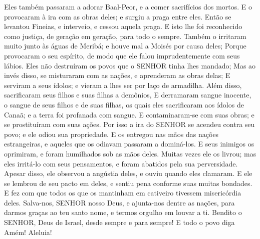 {Eles também passaram a adorar Baal-Peor, e a comer sacrifícios dos mortos.
E o provocaram à ira com as obras deles; e
{} surgiu a praga entre eles.
Então se levantou Fineias, e interveio, e cessou aquela praga.
E isto lhe foi reconhecido como justiça, de geração em geração, para todo o sempre.
Também o irritaram muito junto às águas de Meribá; e houve mal a Moisés por causa deles;
Porque provocaram o seu espírito, de modo que ele falou imprudentemente com seus lábios.
Eles não destruíram os povos que o SENHOR tinha lhes mandado;
Mas ao invés disso, se misturaram com as nações, e aprenderam as obras delas;
E serviram a seus ídolos; e vieram a lhes ser por laço de armadilha.
Além disso, sacrificaram seus filhos e suas filhas a demônios,
E derramaram sangue inocente, o sangue de seus filhos e de suas filhas, os quais eles sacrificaram aos ídolos de Canaã; e a terra foi profanada com
{} sangue.
E contaminaram-se com suas obras; e se prostituíram com suas ações.
Por isso a ira do SENHOR se acendeu contra seu povo; e ele odiou sua propriedade.
E os entregou nas mãos das nações estrangeiras, e aqueles que os odiavam passaram a dominá-los.
E seus inimigos os oprimiram, e foram humilhados sob as mãos deles.
Muitas vezes ele os livrou; mas eles
{} irritá-lo com seus pensamentos, e foram abatidos pela sua perversidade.
Apesar disso, ele observou a angústia deles, e ouviu quando eles clamaram.
E ele se lembrou de seu pacto em
{} deles, e sentiu pena conforme suas muitas bondades.
E fez com que todos os que os mantinham em cativeiro tivessem misericórdia deles.
Salva-nos, SENHOR nosso Deus, e ajunta-nos dentre as nações, para darmos graças ao teu santo nome, e termos orgulho em louvar a ti.
Bendito
{} o SENHOR, Deus de Israel, desde sempre e para sempre! E todo o povo diga Amém! Aleluia!

}
